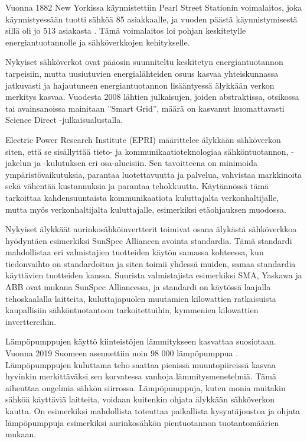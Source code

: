 Vuonna 1882 New Yorkissa käynnistettiin Pearl Street Stationin voimalaitos, joka käynnistyessään tuotti sähköä 85 asiakkaalle, ja vuoden päästä käynnistymisestä sillä oli jo 513 asiakasta \parencite{pearlStreetStation}. Tämä voimalaitos loi pohjan keskitetylle energiantuotannolle ja sähköverkkojen kehitykselle.

Nykyiset sähköverkot ovat pääosin suunniteltu keskitetyn energiantuotannon tarpeisiin, mutta uusiutuvien energialähteiden osuus kasvaa yhteiskunnassa jatkuvasti ja hajautuneen energiantuotannon lisääntyessä älykkään verkon merkitys kasvaa. Vuodesta 2008 lähtien julkaisujen, joiden abstraktissa, otsikossa tai avainsanoissa mainitaan ”Smart Grid”, määrä on kasvanut huomattavasti Science Direct -julkaisualustalla. \parencite{Tuballa&Abundo}

Electric Power Research Institute (EPRI) määrittelee älykkään sähköverkon siten, että se sisällyttää tieto- ja kommunikaatioteknologiaa sähköntuotannon, -jakelun ja -kulutuksen eri osa-alueisiin. Sen tavoitteena on minimoida ympäristövaikutuksia, parantaa luotettavuutta ja palvelua, vahvistaa markkinoita sekä vähentää kustannuksia ja parantaa tehokkuutta. Käytännössä tämä tarkoittaa kahdensuuntaista kommunikaatiota kuluttajalta verkonhaltijalle, mutta myös verkonhaltijalta kuluttajalle, esimerkiksi etäohjauksen muodossa. \parencite{SGdefinition}

Nykyiset älykkäät aurinkosähköinvertterit toimivat osana älykästä sähköverkkoa hyödyntäen esimerkiksi SunSpec Alliancen avointa standardia. Tämä standardi mahdollistaa eri valmistajien tuotteiden käytön samassa kohteessa, kun tiedonvaihto on standardoitua ja siten toimii yhdessä muiden, samaa standardia käyttävien tuotteiden kanssa. Suurista valmistajista esimerkiksi SMA, Yaskawa ja ABB ovat mukana SunSpec Alliancessa, ja standardi on käytössä laajalla tehoskaalalla laitteita, kuluttajapuolen muutamien kilowattien ratkaisuista kaupallisiin sähköntuotantoon tarkoitettuihin, kymmenien kilowattien inverttereihin. \parencite{SSProds}

Lämpöpumppujen käyttö kiinteistöjen lämmitykseen kasvattaa suosiotaan. Vuonna 2019 Suomeen asennettiin noin 98 000 lämpöpumppua \parencite{sulpu}. Lämpöpumppujen kuluttama teho saattaa pienissä muuntopiireissä kasvaa hyvinkin merkittäväksi sen korvatessa vanhoja lämmitysmenetelmiä. Tämä aiheuttaa ongelmia sähkön siirrossa. Lämpöpumppuja, kuten monia muitakin sähköä käyttäviä laitteita, voidaan kuitenkin ohjata älykkään sähköverkon kautta. On esimerkiksi mahdollista toteuttaa paikallista kysyntäjoustoa ja ohjata lämpöpumppuja esimerkiksi aurinkosähkön pientuotannon tuotantomäärien mukaan.

